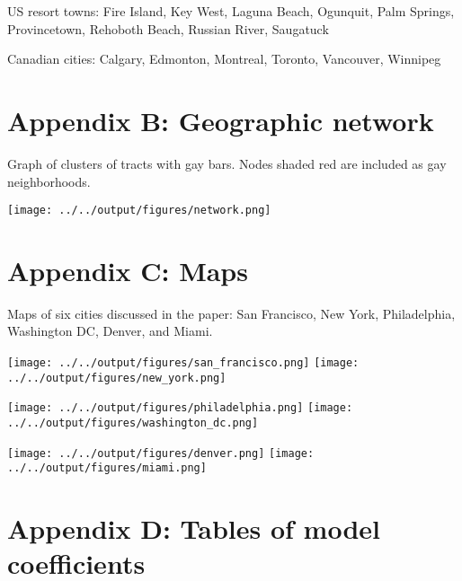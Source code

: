 US resort towns: Fire Island, Key West, Laguna Beach, Ogunquit, Palm
Springs, Provincetown, Rehoboth Beach, Russian River, Saugatuck

Canadian cities: Calgary, Edmonton, Montreal, Toronto, Vancouver,
Winnipeg

\section{Appendix B: Geographic
network}\label{appendix-b-geographic-network}

Graph of clusters of tracts with gay bars. Nodes shaded red are included
as gay neighborhoods.

\texttt{[image: ../../output/figures/network.png]}\\
\newpage

\section{Appendix C: Maps}\label{appendix-c-maps}

Maps of six cities discussed in the paper: San Francisco, New York,
Philadelphia, Washington DC, Denver, and Miami.

\texttt{[image: ../../output/figures/san\_francisco.png]}
\texttt{[image: ../../output/figures/new\_york.png]}

\texttt{[image: ../../output/figures/philadelphia.png]}
\texttt{[image: ../../output/figures/washington\_dc.png]}

\texttt{[image: ../../output/figures/denver.png]}
\texttt{[image: ../../output/figures/miami.png]}

\newpage

\section{Appendix D: Tables of model
coefficients}\label{appendix-d-tables-of-model-coefficients}

